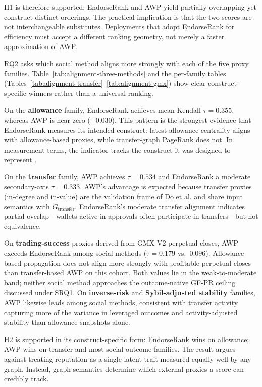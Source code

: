 H1 is therefore supported: EndorseRank and AWP yield partially overlapping yet construct-distinct orderings. The practical implication is that the two scores are not interchangeable substitutes. Deployments that adopt EndorseRank for efficiency must accept a different ranking geometry, not merely a faster approximation of AWP.


RQ2 asks which social method aligns more strongly with each of the five proxy families. Table~\ref{tab:alignment-three-methods} and the per-family tables (Tables~\ref{tab:alignment-transfer}--\ref{tab:alignment-gmx}) show clear construct-specific winners rather than a universal ranking.

On the \textbf{allowance} family, EndorseRank achieves mean Kendall $\tau=0.355$, whereas AWP is near zero ($-0.030$). This pattern is the strongest evidence that EndorseRank measures its intended construct: latest-allowance centrality aligns with allowance-based proxies, while transfer-graph PageRank does not. In measurement terms, the indicator tracks the construct it was designed to represent .

On the \textbf{transfer} family, AWP achieves $\tau=0.534$ and EndorseRank a moderate secondary-axis $\tau=0.333$. AWP's advantage is expected because transfer proxies (in-degree and in-value) are the validation frame of Do et al. and share input semantics with $G_{\text{transfer}}$. EndorseRank's moderate transfer alignment indicates partial overlap---wallets active in approvals often participate in transfers---but not equivalence.

On \textbf{trading-success} proxies derived from GMX V2 perpetual closes, AWP exceeds EndorseRank among social methods ($\tau=0.179$ vs.\ $0.096$). Allowance-based propagation does not align more strongly with profitable perpetual closes than transfer-based AWP on this cohort. Both values lie in the weak-to-moderate band; neither social method approaches the outcome-native GF-PR ceiling discussed under SRQ1. On \textbf{inverse-risk} and \textbf{Sybil-adjusted stability} families, AWP likewise leads among social methods, consistent with transfer activity capturing more of the variance in leveraged outcomes and activity-adjusted stability than allowance snapshots alone.

H2 is supported in its construct-specific form: EndorseRank wins on allowance; AWP wins on transfer and most social-outcome families. The result argues against treating reputation as a single latent trait measured equally well by any graph. Instead, graph semantics determine which external proxies a score can credibly track.

